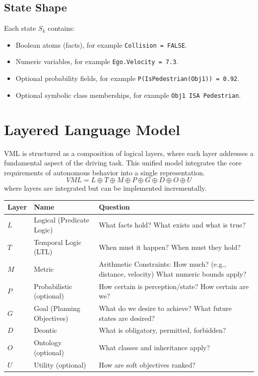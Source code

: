 \documentclass[11pt,a4paper]{article}
\begin{document}
\subsection{State Shape}
Each state $S_k$ contains:
\begin{itemize}[leftmargin=*]
  \item Boolean atoms (facts), for example \texttt{Collision = FALSE}.
  \item Numeric variables, for example \texttt{Ego.Velocity = 7.3}.
  \item Optional probability fields, for example \texttt{P(IsPedestrian(Obj1)) = 0.92}.
  \item Optional symbolic class memberships, for example \texttt{Obj1 ISA Pedestrian}.
\end{itemize}

\section{Layered Language Model}
VML is structured as a composition of logical layers, where each layer addresses a fundamental aspect of the driving task. This unified model integrates the core requirements of autonomous behavior into a single representation.
\[
VML = L \oplus T \oplus M \oplus P \oplus G \oplus D \oplus O \oplus U
\]
where layers are integrated but can be implemented incrementally.

\begin{longtable}{@{}lll@{}}
\toprule
\textbf{Layer} & \textbf{Name} & \textbf{Question} \\
\midrule
$L$ & Logical (Predicate Logic) & What facts hold? What exists and what is true? \\
$T$ & Temporal Logic (LTL) & When must it happen?  When must they hold? \\
$M$ & Metric & Arithmetic Constraints: How much? (e.g., distance, velocity)  What numeric bounds apply? \\
$P$ & Probabilistic (optional) & How certain is perception/state?  How certain are we?\\
$G$ & Goal (Planning Objectives) & What do we desire to achieve?  What future states are desired? \\
$D$ & Deontic & What is obligatory, permitted, forbidden? \\
$O$ & Ontology (optional) & What classes and inheritance apply? \\
$U$ & Utility (optional) & How are soft objectives ranked? \\
\bottomrule
\end{longtable}
\end{document}

